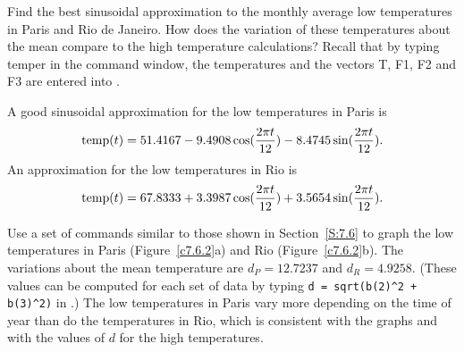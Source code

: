 \documentclass{ximera}
\begin{document}
\begin{computerExercise} \label{c7.6.2}
Find the best sinusoidal approximation to the monthly average low temperatures
in Paris and Rio de Janeiro.  How does the variation of these temperatures
about the mean compare to the high temperature calculations? 
Recall that by typing {\sf temper} in the \Matlab  command window, the temperatures 
and the vectors {\sf T}, {\sf F1}, {\sf F2} and {\sf F3} are entered into \Matlabp.

\begin{solution}

\ans A good sinusoidal approximation for the low temperatures in Paris
is 
\[ \hbox{temp}(t) = 51.4167 - 9.4908\cos(\frac{2\pi t}{12}) -
8.4745\sin(\frac{2\pi t}{12}). \]
An approximation for the low temperatures in Rio is
\[ \hbox{temp}(t) = 67.8333 + 3.3987\cos(\frac{2\pi t}{12}) +
3.5654\sin(\frac{2\pi t}{12}). \]

\soln Use a set of \Matlab commands similar to those shown in
Section~\ref{S:7.6} to graph the low temperatures in Paris
(Figure~\ref{c7.6.2}a) and Rio (Figure~\ref{c7.6.2}b).  The
variations about the mean temperature are $d_P = 12.7237$ and
$d_R = 4.9258$.  (These values can be computed for each set of data
by typing {\tt d = sqrt(b(2)\^{}2 + b(3)\^{}2)} in \Matlabp.) 
The low temperatures in Paris vary more depending on the time of
year than do the temperatures in Rio, which is consistent with
the graphs and with the values of $d$ for the high temperatures.

\begin{figure}[htb]
		\centerline{%
		}
\end{figure}

\end{solution}
\end{computerExercise}
\end{document}
